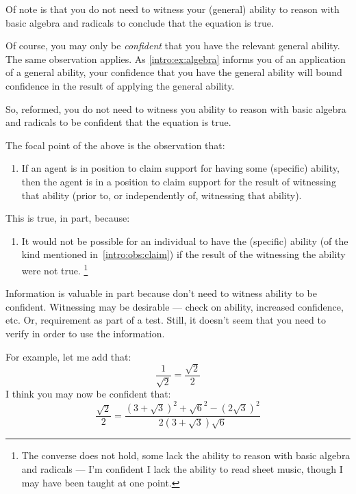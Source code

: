 \begin{note}
  Of note is that you do not need to witness your (general) ability to reason with basic algebra and radicals to conclude that the equation is true.

  Of course, you may only be \emph{confident} that you have the relevant general ability.
  The same observation applies.
  As \ref{intro:ex:algebra} informs you of an application of a general ability, your confidence that you have the general ability will bound confidence in the result of applying the general ability.

  So, reformed, you do not need to witness you ability to reason with basic algebra and radicals to be confident that the equation is true.
\end{note}

\begin{note}[Focus]
  The focal point of the above is the observation that:
  \begin{enumerate}[label=(O\arabic*), ref=(O\arabic*), series=i_ob]
  \item\label{intro:obs:claim} If an agent is in position to claim support for having some (specific) ability, then the agent is in a position to claim support for the result of witnessing that ability (prior to, or independently of, witnessing that ability).
  \end{enumerate}
  This is true, in part, because:
  \begin{enumerate}[label=(O\arabic*), ref=(O\arabic*), resume*=i_ob]
  \item\label{intro:obs:entail} It would not be possible for an individual to have the (specific) ability (of the kind mentioned in~\ref{intro:obs:claim}) if the result of the witnessing the ability were not true.\nolinebreak
    \footnote{The converse does not hold, some lack the ability to reason with basic algebra and radicals --- I'm confident I lack the ability to read sheet music, though I may have been taught at one point.}
  \end{enumerate}
  Information is valuable in part because don't need to witness ability to be confident.
  Witnessing may be desirable --- check on ability, increased confidence, etc. Or, requirement as part of a test.
  Still, it doesn't seem that you need to verify in order to use the information.

  For example, let me add that:
  \[\frac{1}{\sqrt{2}} = \frac{\sqrt{2}}{2}\]
  I think you may now be confident that:
  \[\frac{\sqrt{2}}{2} = \frac{(3 + \sqrt{3})^{2} + \sqrt{6}^{2} - (2\sqrt{3})^{2}}{2(3 + \sqrt{3})\sqrt{6}}\]
\end{note}

